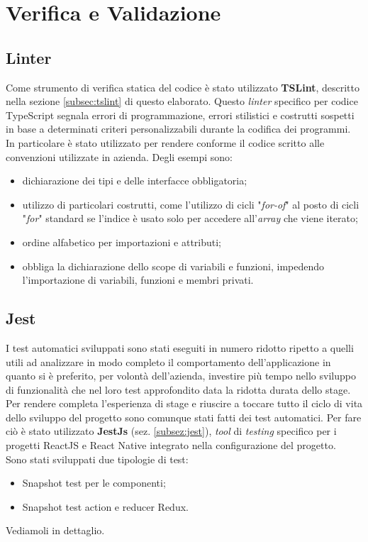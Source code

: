 
\chapter{Verifica e Validazione}\label{chap:tests}
\section{Linter}
Come strumento di verifica statica del codice è stato utilizzato \textbf{TSLint}, descritto nella sezione \ref{subsec:tslint} di questo elaborato. Questo \emph{linter} specifico per codice TypeScript segnala errori di programmazione, errori stilistici e costrutti sospetti in base a determinati criteri personalizzabili durante la codifica dei programmi.\\
In particolare è stato utilizzato per rendere conforme il codice scritto alle convenzioni utilizzate in azienda. Degli esempi sono:
\begin{itemize}
	\item dichiarazione dei tipi e delle interfacce obbligatoria;
	\item utilizzo di particolari costrutti, come l'utilizzo di cicli "\emph{for-of}" al posto di cicli "\emph{for}" standard se l'indice è usato solo per accedere all'\emph{array} che viene iterato;
	\item ordine alfabetico per importazioni e attributi; 
	\item obbliga la dichiarazione dello scope di variabili e funzioni, impedendo l'importazione di variabili, funzioni e membri privati.
\end{itemize}
\section{Jest}
I test automatici sviluppati sono stati eseguiti in numero ridotto ripetto a quelli utili ad analizzare in modo completo il comportamento dell'applicazione in quanto si è preferito, per volontà dell'azienda, investire più tempo nello sviluppo di funzionalità che nel loro test approfondito data la ridotta durata dello stage. \\
Per rendere completa l'esperienza di stage e riuscire a toccare tutto il ciclo di vita dello sviluppo del progetto sono comunque stati fatti dei test automatici. Per fare ciò è stato utilizzato \textbf{JestJs} (sez. \ref{subsez:jest}), \emph{tool} di \emph{testing} specifico per i progetti ReactJS e React Native integrato nella configurazione del progetto. \\
Sono stati sviluppati due tipologie di test:
\begin{itemize}
	\item Snapshot test per le componenti;
	\item Snapshot test action e reducer Redux.
\end{itemize}
Vediamoli in dettaglio.
